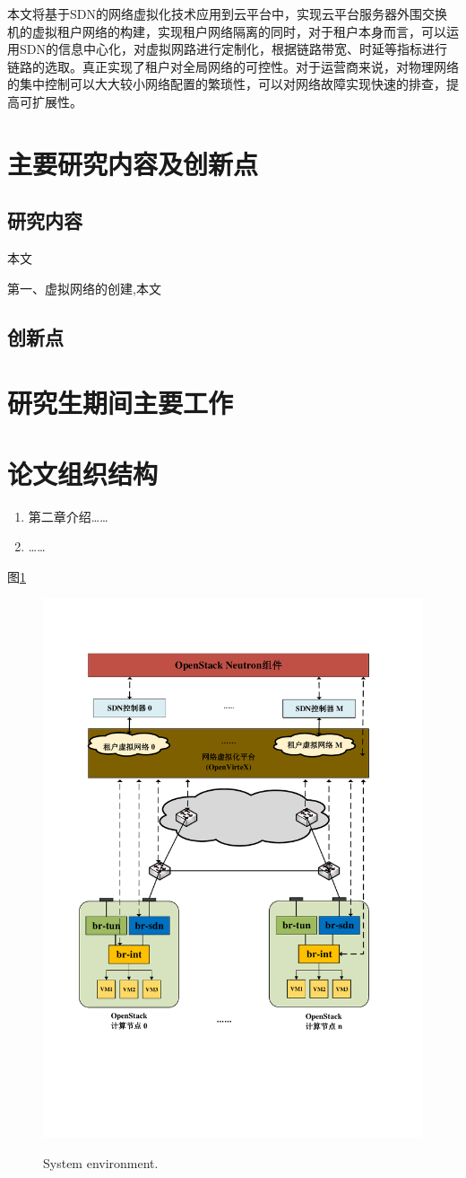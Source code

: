 本文将基于SDN的网络虚拟化技术应用到云平台中，实现云平台服务器外围交换机的虚拟租户网络的构建，实现租户网络隔离的同时，对于租户本身而言，可以运用SDN的信息中心化，对虚拟网路进行定制化，根据链路带宽、时延等指标进行链路的选取。真正实现了租户对全局网络的可控性。对于运营商来说，对物理网络的集中控制可以大大较小网络配置的繁琐性，可以对网络故障实现快速的排查，提高可扩展性。
\section{主要研究内容及创新点}
\subsection{研究内容}
本文

第一、虚拟网络的创建,本文
\subsection{创新点}
\section{研究生期间主要工作}
\section{论文组织结构}


\begin{enumerate}
\item 第二章介绍……
\item ……
\end{enumerate}
图\ref{fig:env1}

\begin{figure}[!htb]
  \centering
  \includegraphics[width=120mm]{logo/architecture}\\
  \caption{System environment.}
  \label{fig:env1}
\end{figure}

\ifx\usechapbib\empty
\nocite{BSTcontrol}
\setcounter{NAT@ctr}{0}


\fi
